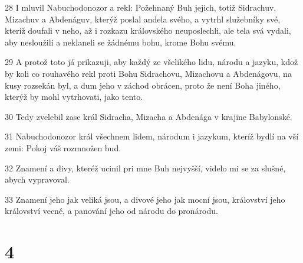 \par 28 I mluvil Nabuchodonozor a rekl: Požehnaný Buh jejich, totiž Sidrachuv, Mizachuv a Abdenáguv, kterýž poslal andela svého, a vytrhl služebníky své, kteríž doufali v neho, až i rozkazu královského neuposlechli, ale tela svá vydali, aby nesloužili a neklaneli se žádnému bohu, krome Bohu svému.
\par 29 A protož toto já prikazuji, aby každý ze všelikého lidu, národu a jazyku, kdož by koli co rouhavého rekl proti Bohu Sidrachovu, Mizachovu a Abdenágovu, na kusy rozsekán byl, a dum jeho v záchod obrácen, proto že není Boha jiného, kterýž by mohl vytrhovati, jako tento.
\par 30 Tedy zvelebil zase král Sidracha, Mizacha a Abdenága v krajine Babylonské.
\par 31 Nabuchodonozor král všechnem lidem, národum i jazykum, kteríž bydlí na vší zemi: Pokoj váš rozmnožen bud.
\par 32 Znamení a divy, kteréž ucinil pri mne Buh nejvyšší, videlo mi se za slušné, abych vypravoval.
\par 33 Znamení jeho jak veliká jsou, a divové jeho jak mocní jsou, království jeho království vecné, a panování jeho od národu do pronárodu.

\chapter{4}

